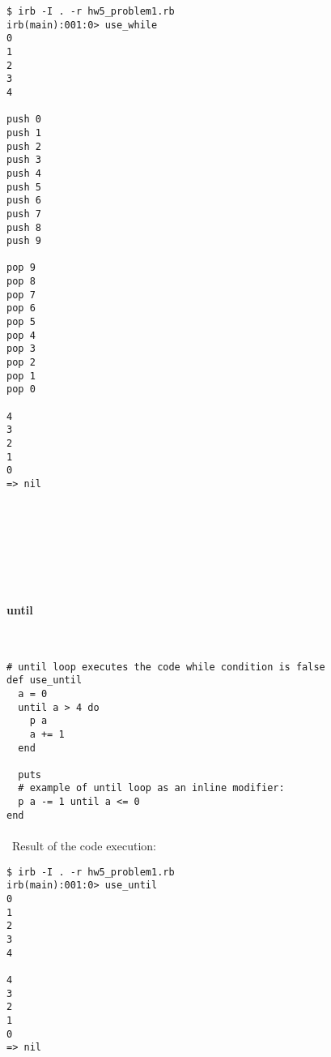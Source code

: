 \documentclass{article}
\begin{document}
\begin{verbatim} 
$ irb -I . -r hw5_problem1.rb
irb(main):001:0> use_while
0
1
2
3
4

push 0
push 1
push 2
push 3
push 4
push 5
push 6
push 7
push 8
push 9

pop 9
pop 8
pop 7
pop 6
pop 5
pop 4
pop 3
pop 2
pop 1
pop 0

4
3
2
1
0
=> nil
\end{verbatim}

\paragraph{}\
\paragraph{}\
\paragraph{}\

\paragraph{ until}\

\begin{verbatim}
# until loop executes the code while condition is false
def use_until
  a = 0
  until a > 4 do
    p a
    a += 1
  end

  puts
  # example of until loop as an inline modifier:
  p a -= 1 until a <= 0
end
\end{verbatim}

\paragraph{}\
Result of the code execution:

\begin{verbatim} 
$ irb -I . -r hw5_problem1.rb
irb(main):001:0> use_until
0
1
2
3
4

4
3
2
1
0
=> nil
\end{verbatim}


\paragraph{}\
\paragraph{}\
\end{document}
